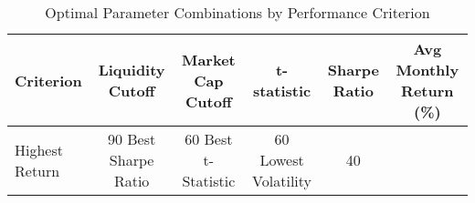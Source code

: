\begin{table}[htbp]
\caption{Optimal Parameter Combinations by Performance Criterion}
\label{tab:best_constraint_combinations}
\begin{tabular}{l|cc|ccc}
\hline
Criterion & Liquidity Cutoff & Market Cap Cutoff & t-statistic & Sharpe Ratio & Avg Monthly Return (\%) \\
\hline
Highest Return & 90%
Best Sharpe Ratio & 60%
Best t-Statistic & 60%
Lowest Volatility & 40%
\hline
\end{tabular}
\end{table}
